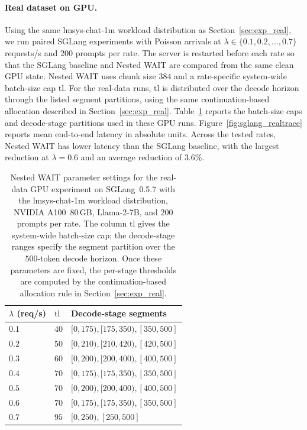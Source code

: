 \paragraph{Real dataset on GPU.}
Using the same lmsys-chat-1m workload distribution as Section~\ref{sec:exp_real}, we run paired SGLang experiments with Poisson arrivals at $\lambda \in \{0.1, 0.2, \ldots, 0.7\}$ requests/s and $200$ prompts per rate. The server is restarted before each rate so that the SGLang baseline and Nested WAIT are compared from the same clean GPU state. Nested WAIT uses chunk size $384$ and a rate-specific system-wide batch-size cap $\mathrm{tl}$. For the real-data runs, $\mathrm{tl}$ is distributed over the decode horizon through the listed segment partitions, using the same continuation-based allocation described in Section~\ref{sec:exp_real}. Table~\ref{tab:sglang_realtrace} reports the batch-size caps and decode-stage partitions used in these GPU runs. Figure~\ref{fig:sglang_realtrace} reports mean end-to-end latency in absolute units. Across the tested rates, Nested WAIT has lower latency than the SGLang baseline, with the largest reduction at $\lambda = 0.6$ and an average reduction of $3.6\%$.

\begin{table}[ht]
\centering
\small
\begin{tabularx}{0.82\textwidth}{>{\centering\arraybackslash}p{}>{\centering\arraybackslash}p{}>{\centering\arraybackslash}X}
\toprule
$\lambda$ (req/s) & $\mathrm{tl}$ & Decode-stage segments \\
\midrule
$0.1$ & $40$  & $[0,175), [175,350), [350,500]$ \\
$0.2$ & $50$  & $[0,210), [210,420), [420,500]$ \\
$0.3$ & $60$  & $[0,200), [200,400), [400,500]$ \\
$0.4$ & $70$  & $[0,175), [175,350), [350,500]$ \\
$0.5$ & $70$  & $[0,200), [200,400), [400,500]$ \\
$0.6$ & $70$  & $[0,175), [175,350), [350,500]$ \\
$0.7$ & $95$  & $[0,250), [250,500]$ \\
\bottomrule
\end{tabularx}
\caption{Nested WAIT parameter settings for the real-data GPU experiment on SGLang~0.5.7 with the lmsys-chat-1m workload distribution, NVIDIA A100~80\,GB, Llama-2-7B, and $200$ prompts per rate. The column $\mathrm{tl}$ gives the system-wide batch-size cap; the decode-stage ranges specify the segment partition over the $500$-token decode horizon. Once these parameters are fixed, the per-stage thresholds are computed by the continuation-based allocation rule in Section~\ref{sec:exp_real}.}
\label{tab:sglang_realtrace}
\end{table}

